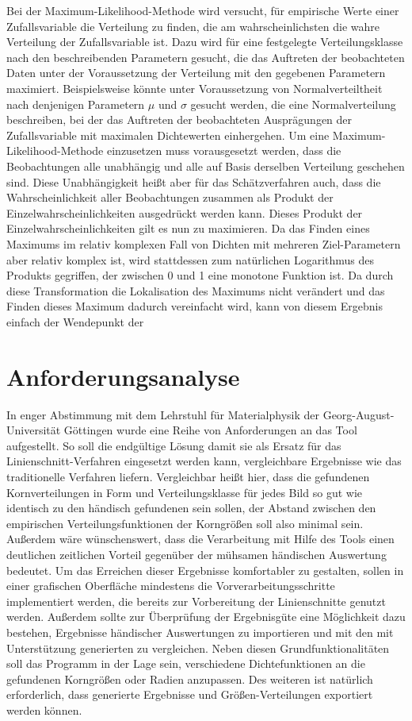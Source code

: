\documentclass[
  12pt,
]{book}
\begin{document}
Bei der Maximum-Likelihood-Methode wird versucht, für empirische Werte einer Zufallsvariable die Verteilung zu finden, die am wahrscheinlichsten die wahre Verteilung der Zufallsvariable ist. Dazu wird für eine festgelegte Verteilungsklasse nach den beschreibenden Parametern gesucht, die das Auftreten der beobachteten Daten unter der Voraussetzung der Verteilung mit den gegebenen Parametern maximiert. Beispielsweise könnte unter Voraussetzung von Normalverteiltheit nach denjenigen Parametern \(\mu\) und \(\sigma\) gesucht werden, die eine Normalverteilung beschreiben, bei der das Auftreten der beobachteten Ausprägungen der Zufallsvariable mit maximalen Dichtewerten einhergehen.
Um eine Maximum-Likelihood-Methode einzusetzen muss vorausgesetzt werden, dass die Beobachtungen alle unabhängig und alle auf Basis derselben Verteilung geschehen sind. Diese Unabhängigkeit heißt aber für das Schätzverfahren auch, dass die Wahrscheinlichkeit aller Beobachtungen zusammen als Produkt der Einzelwahrscheinlichkeiten ausgedrückt werden kann. Dieses Produkt der Einzelwahrscheinlichkeiten gilt es nun zu maximieren. Da das Finden eines Maximums im relativ komplexen Fall von Dichten mit mehreren Ziel-Parametern aber relativ komplex ist, wird stattdessen zum natürlichen Logarithmus des Produkts gegriffen, der zwischen 0 und 1 eine monotone Funktion ist. Da durch diese Transformation die Lokalisation des Maximums nicht verändert und das Finden dieses Maximum dadurch vereinfacht wird, kann von diesem Ergebnis einfach der Wendepunkt der

\hypertarget{anforderungsanalyse}{%
\chapter{Anforderungsanalyse}\label{anforderungsanalyse}}

In enger Abstimmung mit dem Lehrstuhl für Materialphysik der Georg-August-Universität Göttingen wurde eine Reihe von Anforderungen an das Tool aufgestellt.
So soll die endgültige Lösung damit sie als Ersatz für das Linienschnitt-Verfahren eingesetzt werden kann, vergleichbare Ergebnisse wie das traditionelle Verfahren liefern. Vergleichbar heißt hier, dass die gefundenen Kornverteilungen in Form und Verteilungsklasse für jedes Bild so gut wie identisch zu den händisch gefundenen sein sollen, der Abstand zwischen den empirischen Verteilungsfunktionen der Korngrößen soll also minimal sein.
Außerdem wäre wünschenswert, dass die Verarbeitung mit Hilfe des Tools einen deutlichen zeitlichen Vorteil gegenüber der mühsamen händischen Auswertung bedeutet.
Um das Erreichen dieser Ergebnisse komfortabler zu gestalten, sollen in einer grafischen Oberfläche mindestens die Vorverarbeitungsschritte implementiert werden, die bereits zur Vorbereitung der Linienschnitte genutzt werden. Außerdem sollte zur Überprüfung der Ergebnisgüte eine Möglichkeit dazu bestehen, Ergebnisse händischer Auswertungen zu importieren und mit den mit Unterstützung generierten zu vergleichen.
Neben diesen Grundfunktionalitäten soll das Programm in der Lage sein, verschiedene Dichtefunktionen an die gefundenen Korngrößen oder Radien anzupassen. Des weiteren ist natürlich erforderlich, dass generierte Ergebnisse und Größen-Verteilungen exportiert werden können.
\end{document}
